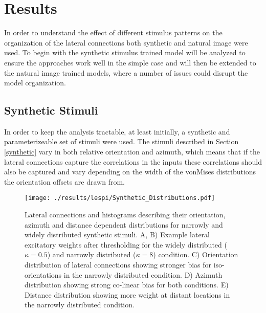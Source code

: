 \section{Results}

In order to understand the effect of different stimulus patterns on
the organization of the lateral connections both synthetic and natural
image were used. To begin with the synthetic stimulus trained model
will be analyzed to ensure the approaches work well in the simple case
and will then be extended to the natural image trained models, where a
number of issues could disrupt the model organization.

\subsection{Synthetic Stimuli}

In order to keep the analysis tractable, at least initially, a
synthetic and parameterizeable set of stimuli were used. The stimuli
described in Section \ref{synthetic} vary in both relative orientation
and azimuth, which means that if the lateral connections capture the
correlations in the inputs these correlations should also be captured
and vary depending on the width of the vonMises distributions the
orientation offsets are drawn from.

\begin{figure}
	\centering
    \texttt{[image: ./results/lespi/Synthetic\_Distributions.pdf]}
	\caption[Distributions of lateral connections of models trained on
      synthetic stimuli]{Lateral connections and histograms describing
      their orientation, azimuth and distance dependent distributions
      for narrowly and widely distributed synthetic stimuli. A, B)
      Example lateral excitatory weights after thresholding for the
      widely distributed ($\kappa=0.5$) and narrowly distributed
      ($\kappa=8$) condition. C) Orientation distribution of lateral
      connections showing stronger bias for iso-orientations in the
      narrowly distributed condition. D) Azimuth distribution showing
      strong co-linear bias for both conditions. E) Distance
      distribution showing more weight at distant locations in the
      narrowly distributed condition.}
	\label{SyntheticDistributions}
\end{figure}

